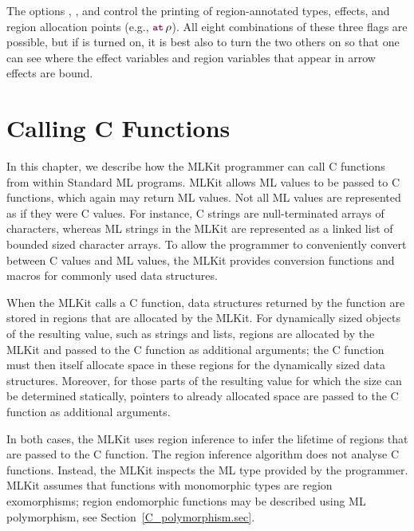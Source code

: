\documentclass[12pt]{book}
\begin{document}
The options
%
%
%
,
%
%
%
, and
%
%
%
 control the printing of region-annotated types, effects,
and region allocation points (e.g., $\fw{at}\,\rho$).  All eight combinations of
these three flags are possible, but if
%
%
%
 is turned on, it is best also to turn the two others on so
that one can see where the effect variables and region variables that appear in
arrow effects are bound.

\chapter{Calling C Functions}
\label{ccall.sec}

In this chapter, we describe how the MLKit programmer can call
%
%
%
C functions from within Standard ML programs.  MLKit allows ML values to be
passed to C functions, which again may return ML values.  Not all ML values are
represented as if they were C values. For instance, C strings are
null-terminated arrays of characters, whereas ML strings in the MLKit are
represented as a linked list of bounded sized character arrays. To allow the
programmer to conveniently convert between C values and ML values, the MLKit
provides conversion functions and macros for commonly used data structures.

When the MLKit calls a C function, data structures returned by the function are
stored in regions that are allocated by the MLKit. For dynamically sized objects
of the resulting value, such as strings and lists, regions are allocated by the
MLKit and passed to the C function as additional arguments; the C function must
then itself allocate space in these regions for the dynamically sized data
structures. Moreover, for those parts of the resulting value for which the size
can be determined statically, pointers to already allocated space are passed to
the C function as additional arguments.

In both cases, the MLKit uses region inference to infer the lifetime of
regions that are passed to the C function.  The region inference
algorithm does not analyse C functions. Instead, the MLKit inspects the
ML type provided by the programmer. MLKit assumes that functions
with monomorphic types are
%
%
%
region exomorphisms;
%
%
%
region endomorphic functions may be described using ML polymorphism, see
Section~\ref{C_polymorphism.sec}.
\end{document}
